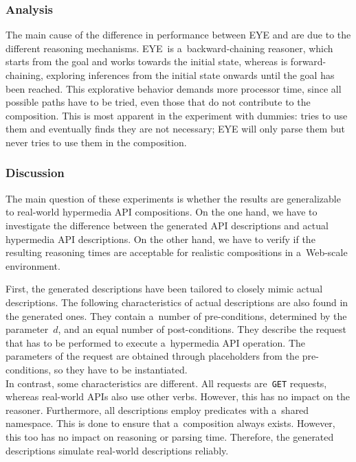 \subsubsection{Analysis}
The main cause of the difference in performance between EYE and \cwm
are due to the different reasoning mechanisms.
EYE~is a~backward-chaining reasoner,
which starts from the goal and works towards the initial state,
whereas \cwm is forward-chaining,
exploring inferences from the initial state onwards
until the goal has been reached.
This explorative behavior demands more processor time,
since all possible paths have to be tried,
even those that do not contribute to the composition.
This is most apparent in the experiment with dummies:
\cwm tries to use them and eventually finds they are not necessary;
EYE will only parse them but never tries to use them in the composition.

\vspace{-1em}
\subsubsection{Discussion}
The main question of these experiments
is whether the results are generalizable to real-world hypermedia API compositions.
On the one hand,
we have to investigate the difference between the generated API descriptions
and actual hypermedia API descriptions.
On the other hand,
we have to verify if the resulting reasoning times are acceptable
for realistic compositions in a~Web-scale environment.

First, the generated descriptions have been tailored to closely mimic actual \restdesc descriptions.
The following characteristics of actual descriptions are also found in the generated ones.
They contain a~number of pre-conditions, determined by the parameter~$d$,
and an equal number of post-conditions.
They describe the \http request that has to be performed
to execute a~hypermedia API operation.
The parameters of the request are obtained through placeholders from the pre-conditions,
so they have to be instantiated.
\\
In contrast, some characteristics are different.
All requests are~\Verb!GET! requests,
whereas real-world APIs also use other \http verbs.
However, this has no impact on the reasoner.
Furthermore, all descriptions employ predicates with a~shared \uri namespace.
This is done to ensure that a~composition always exists.
However, this too has no impact on reasoning or parsing time.
Therefore, the generated descriptions simulate real-world descriptions reliably.

